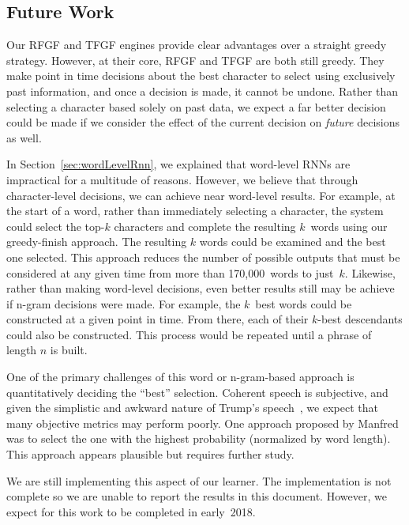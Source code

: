 \documentclass{article}
\begin{document}
\subsection{Future Work}

Our RFGF and TFGF engines provide clear advantages over a straight greedy strategy.  However, at their core, RFGF and TFGF are both still greedy.  They make point in time decisions about the best character to select using exclusively past information, and once a decision is made, it cannot be undone.  Rather than selecting a character based solely on past data, we expect a far better decision could be made if we consider the effect of the current decision on \textit{future} decisions as well.

In Section~\ref{sec:wordLevelRnn}, we explained that word-level RNNs are impractical for a multitude of reasons. However, we believe that through character-level decisions, we can achieve near word-level results.  For example, at the start of a word, rather than immediately selecting a character, the system could select the top-$k$ characters and complete the resulting $k$~words using our greedy-finish approach.  The resulting $k$ words could be examined and the best one selected.  This approach reduces the number of possible outputs that must be considered at any given time from more than 170,000~words to just~$k$.  Likewise, rather than making word-level decisions, even better results still may be achieve if n-gram decisions were made.  For example, the $k$~best words could be constructed at a given point in time.  From there, each of their $k$-best descendants could also be constructed.  This process would be repeated until a phrase of length $n$ is built.  

One of the primary challenges of this word or n-gram-based approach is quantitatively deciding the ``best'' selection.  Coherent speech is subjective, and given the simplistic and awkward nature of Trump's speech~\cite{goldhill2017}, we expect that many objective metrics may perform poorly. One approach proposed by Manfred was to select the one with the highest probability (normalized by word length). This approach appears plausible but requires further study.

We are still implementing this aspect of our learner.  The implementation is not complete so we are unable to report the results in this document.  However, we expect for this work to be completed in early~2018.



\end{document}
